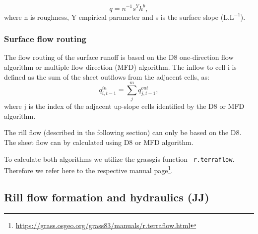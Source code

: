         \begin{equation} 
        q = n^{-1} s^Y h^b,
        \label{eq:powerlaw2}
        \end{equation}
        where n is roughness,  Y  empirical parameter and s is the surface
        slope ($\mathrm{L.L^{-1}}$).

        \subsubsection{Surface flow routing}

            The flow routing of the surface runoff is based on the D8 one-direction flow
            algorithm \cite{o1984extraction} or multiple flow direction (MFD) algorithm.
            The inflow to cell i is defined as the sum of the sheet outflows
            from the adjacent cells, as:
            \begin{equation} 
            q^{in}_{i,t-1} = \sum_j^m q^{out}_{j,t-1}, 
            \label{eq:d8}
            \end{equation} 
            where j is the index of the adjacent up-slope cells identified by the D8 or MFD
            algorithm. 

            The rill flow (described in the following section) can only be
            based on the D8. The sheet flow can by calculated using D8 or MFD
            algorithm.
            
            To calculate both algorithms we utilize the grassgis function {\tt
            r.terraflow}. Therefore we refer here to the respective manual
            page\footnote{\href{https://grass.osgeo.org/grass83/manuals/r.terraflow.html}{https://grass.osgeo.org/grass83/manuals/r.terraflow.html}}.

        \subsection{Rill flow formation and hydraulics (JJ)}


